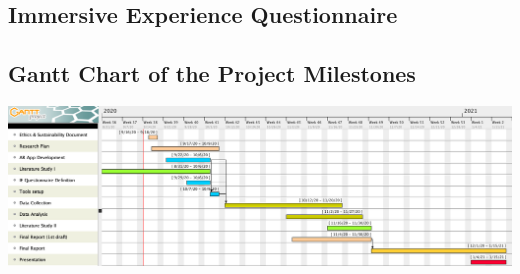 \documentclass[12pt,twoside,english]{article}
\begin{document}
\subsection{Immersive Experience Questionnaire}
\label{sect:ieq}


\subsection{Gantt Chart of the Project Milestones}
\label{sect:gantt_chart}

\includegraphics[width=\textwidth]{imgs/project_milestones}

\printglossary[type=\acronymtype, nonumberlist]
\clearpage
\end{document}
